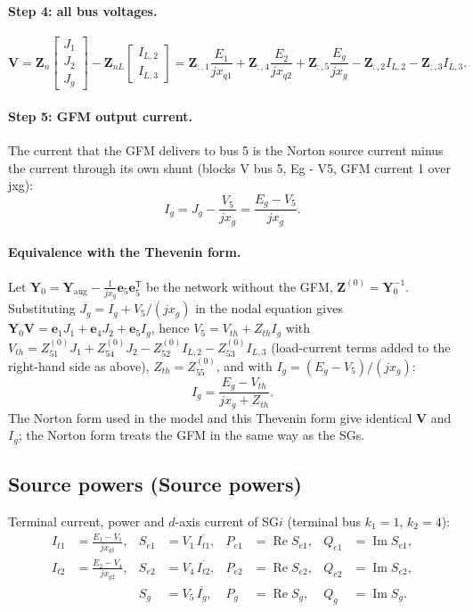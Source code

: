\documentclass[11pt,a4paper]{article}
\numberwithin{equation}{section}
\newcommand{\cj}[1]{\overline{#1}}
\newcommand{\re}{\operatorname{Re}}
\newcommand{\im}{\operatorname{Im}}
\newcommand{\blk}[1]{\textsf{#1}}
\begin{document}
\paragraph{Step 4: all bus voltages.}
\begin{equation}
\boxed{\bm V = \bm Z_n\begin{bmatrix}J_1\\ J_2\\ J_g\end{bmatrix} - \bm Z_{nL}\begin{bmatrix}I_{L,2}\\ I_{L,3}\end{bmatrix}
= \bm Z_{:,1}\frac{E_1}{jx_{q1}} + \bm Z_{:,4}\frac{E_2}{jx_{q2}} + \bm Z_{:,5}\frac{E_g}{jx_g} - \bm Z_{:,2}I_{L,2} - \bm Z_{:,3}I_{L,3}.}
\end{equation}

\paragraph{Step 5: GFM output current.}
The current that the GFM delivers to bus 5 is the Norton source current minus the current through its own shunt (blocks \blk{V bus 5}, \blk{Eg - V5}, \blk{GFM current 1 over jxg}):
\begin{equation}
\boxed{I_g = J_g - \frac{V_5}{jx_g} = \frac{E_g - V_5}{jx_g}.}
\end{equation}

\paragraph{Equivalence with the Thevenin form.}
Let $\bm Y_0 = \bm Y_{\text{aug}} - \tfrac{1}{jx_g}\bm e_5\bm e_5^{\mathsf T}$ be the network without the GFM, $\bm Z^{(0)} = \bm Y_0^{-1}$. Substituting $J_g = I_g + V_5/(jx_g)$ in the nodal equation gives $\bm Y_0\bm V = \bm e_1J_1+\bm e_4J_2+\bm e_5I_g$, hence $V_5 = V_{th} + Z_{th}I_g$ with $V_{th} = Z^{(0)}_{51}J_1 + Z^{(0)}_{54}J_2 - Z^{(0)}_{52}I_{L,2} - Z^{(0)}_{53}I_{L,3}$ (load-current terms added to the right-hand side as above), $Z_{th} = Z^{(0)}_{55}$, and with $I_g = (E_g - V_5)/(jx_g)$:
\begin{equation}
I_g = \frac{E_g - V_{th}}{jx_g + Z_{th}} .
\end{equation}
The Norton form used in the model and this Thevenin form give identical $\bm V$ and $I_g$; the Norton form treats the GFM in the same way as the SGs.

\subsection{Source powers (\blk{Source powers})}
Terminal current, power and $d$-axis current of SG$i$ (terminal bus $k_1=1$, $k_2=4$):
\begin{align}
I_{t1} &= \frac{E_1 - V_1}{jx_{q1}}, & S_{e1} &= V_1\,\cj{I_{t1}}, & P_{e1}&=\re S_{e1}, & Q_{e1}&=\im S_{e1},\\
I_{t2} &= \frac{E_2 - V_4}{jx_{q2}}, & S_{e2} &= V_4\,\cj{I_{t2}}, & P_{e2}&=\re S_{e2}, & Q_{e2}&=\im S_{e2},\\
       &                           & S_{g} &= V_5\,\cj{I_g},    & P_{g}&=\re S_{g}, & Q_{g}&=\im S_{g}.
\end{align}
\end{document}
